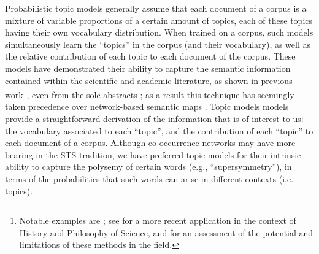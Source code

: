 \documentclass[smallextended]{svjour3}
\begin{document}
Probabilistic topic models  generally assume that each document of a corpus is a mixture of variable proportions of a certain amount of topics, each of these topics having their own vocabulary distribution. When trained on a corpus, such models simultaneously learn the ``topics'' in the corpus (and their vocabulary), as well as the relative contribution of each topic to each document of the corpus. %
These models have demonstrated their ability to capture the semantic information contained within the scientific and academic literature, as shown in previous work\footnote{Notable examples are \citealt{Nichols2014,Hall2008,Griffiths2004}; see \citealt{Malaterre2022} for a more recent application in the context of History and Philosophy of Science, and \citealt{Allen2022} for an assessment of the potential and limitations of these methods in the field.}, even from the sole abstracts \citep{Syed2017}; as a result this technique has seemingly taken precedence over network-based semantic maps \citep[Figure~1]{Leydesdorff2016}. Topic models models provide a straightforward derivation of the information that is of interest to us: the vocabulary associated to each ``topic'', and the contribution of each ``topic'' to each document of a corpus. Although co-occurrence networks may have more bearing in the STS tradition, we have preferred topic models for their intrinsic ability to capture the polysemy of certain words (e.g., ``supersymmetry''), in terms of the probabilities that such words can arise in different contexts (i.e. topics).
\end{document}
